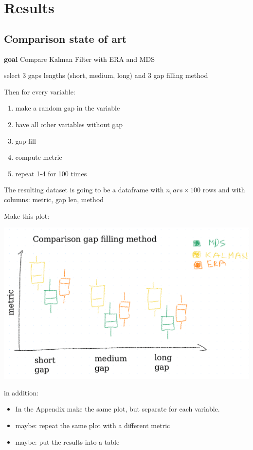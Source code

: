 \documentclass{article}
\let\Oldsection\section
\renewcommand{\section}{\FloatBarrier\Oldsection}
\let\Oldsubsection\subsection
\renewcommand{\subsection}{\FloatBarrier\Oldsubsection}
\begin{document}
\section{Results}

\subsection{Comparison state of art}

\textbf{goal} Compare Kalman Filter with ERA and MDS

select 3 gaps lengths (short, medium, long) and 3 gap filling method

Then for every variable:
\begin{enumerate}
    \item make a random gap in the variable
    \item have all other variables without gap
    \item gap-fill
    \item compute metric
    \item repeat 1-4 for 100 times
\end{enumerate}

The resulting dataset is going to be a dataframe with $n_vars \times 100$ rows and with columns: metric, gap len, method

Make this plot:

\includegraphics[width=\textwidth]{images/plot_example_comp_methods.png}

in addition:
\begin{itemize}
    \item In the Appendix make the same plot, but separate for each variable.
    \item maybe: repeat the same plot with a different metric
    \item maybe: put the results into a table
\end{itemize}
\end{document}
